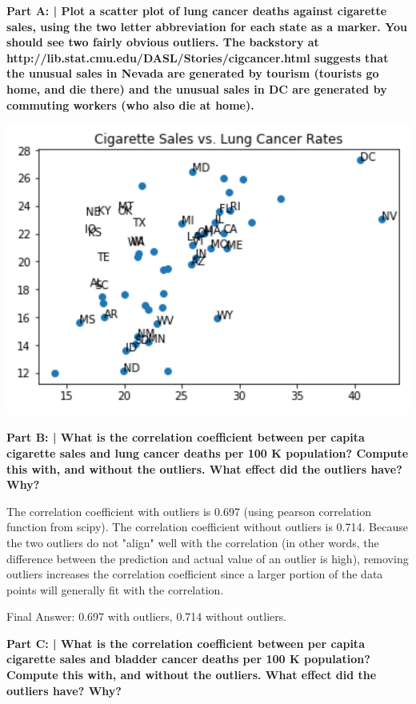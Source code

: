 \documentclass{article}
\begin{document}
 \textbf{Part A: | Plot a scatter plot of lung cancer deaths against cigarette sales, using the two letter abbreviation for each state as a marker. You should see two fairly obvious outliers. The backstory at http://lib.stat.cmu.edu/DASL/Stories/cigcancer.html suggests that the unusual sales in Nevada are generated by tourism (tourists go home, and die there) and the unusual sales in DC are generated by commuting workers (who also die at home).}\newline
 
 \includegraphics{HW2_1.PNG}
 
 \textbf{Part B: | What is the correlation coefficient between per capita cigarette sales and lung cancer deaths per 100 K population? Compute this with, and without the outliers. What effect did the outliers have? Why?}\newline
 
 The correlation coefficient with outliers is 0.697 (using pearson correlation function from scipy). The correlation coefficient without outliers is 0.714. Because the two outliers do not "align" well with the correlation (in other words, the difference between the prediction and actual value of an outlier is high), removing outliers increases the correlation coefficient since a larger portion of the data points will generally fit with the correlation.\newline
 
 Final Answer: 0.697 with outliers, 0.714 without outliers.\newline
 
 \textbf{Part C: | What is the correlation coefficient between per capita cigarette sales and bladder cancer deaths per 100 K population? Compute this with, and without the outliers. What effect did the outliers have? Why?}\newline
 
\end{document}
